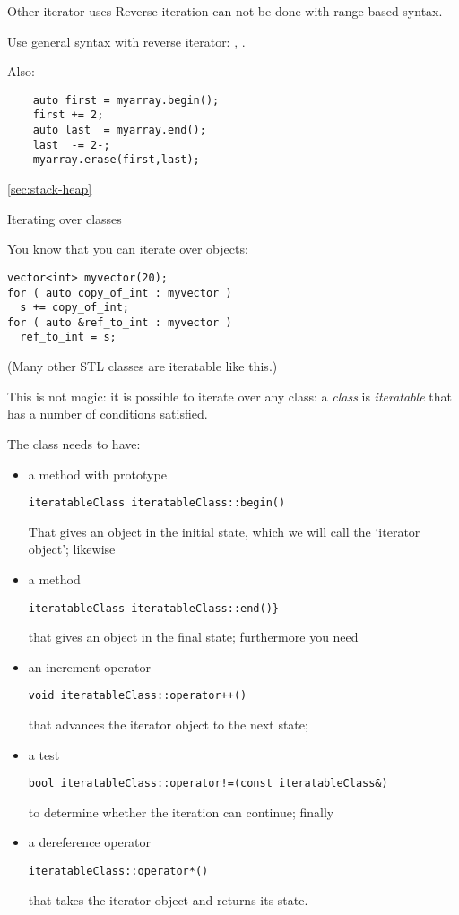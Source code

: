 \begin{block}{Other iterator uses}
  \label{sl:reverse-iterator}
  Reverse iteration can not be done with range-based syntax.
  
  Use general syntax with reverse iterator: ,
  .

  Also:
  \begin{lstlisting}
    auto first = myarray.begin();
    first += 2;
    auto last  = myarray.end();
    last  -= 2-;
    myarray.erase(first,last);
  \end{lstlisting}
\end{block}



\ref{sec:stack-heap}

 {Iterating over classes}
\label{sec:range-iter}

You know that you can iterate over  objects:
\begin{lstlisting}
vector<int> myvector(20);
for ( auto copy_of_int : myvector )
  s += copy_of_int;
for ( auto &ref_to_int : myvector )
  ref_to_int = s;
\end{lstlisting}
(Many other \ac{STL} classes are iteratable like this.)

This is not magic: it is possible to iterate over any class:
a \emph{class} is 
\emph{iteratable} that has a number of conditions satisfied.

The class needs to have:
\begin{itemize}
\item a method  with prototype
\begin{lstlisting}
iteratableClass iteratableClass::begin()
\end{lstlisting}
That gives an
  object in the initial state, which we will call the `iterator object'; likewise
\item a method 
\begin{lstlisting}
iteratableClass iteratableClass::end()} 
\end{lstlisting}
that gives an 
  object in the final state; furthermore you need
\item an increment operator
\begin{lstlisting}
void iteratableClass::operator++()
\end{lstlisting}
that
  advances the iterator object to the next state;
\item a test
\begin{lstlisting}
bool iteratableClass::operator!=(const iteratableClass&)
\end{lstlisting}
to determine
  whether the iteration can continue; finally
\item a dereference operator 
\begin{lstlisting}
iteratableClass::operator*()
\end{lstlisting}
that takes the iterator object and returns its state.
\end{itemize}

